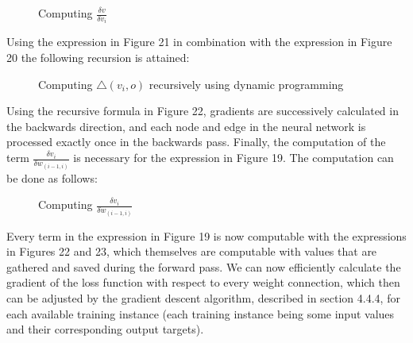 \documentclass[titlepage]{article}
\begin{document}
\vskip 0.2cm

\begin{figure}[h]
    \centerline{}
    \vskip 0.2cm
    \caption{Computing $\frac{\delta v}{\delta v_{i}}$}
\end{figure}

\vskip 0.3cm

\noindent
Using the expression in Figure 21 in combination with the expression in Figure 20 the following recursion is attained:

\vskip 0.3cm

\begin{figure}[h]
    \centerline{
    }
    \vskip 0.3cm
    \caption{Computing $\triangle (v_{i}, o)$ recursively using dynamic programming}
\end{figure}

\vskip 0.2cm

\noindent
Using the recursive formula in Figure 22, gradients are successively calculated in the backwards direction, and each node and edge in the neural network is processed exactly once in the backwards pass. Finally, the computation of the term $\frac{\delta v_{i}}{\delta w_{(i-1, i)}}$ is necessary for the expression in Figure 19. The computation can be done as follows:

\vskip 0.3cm

\begin{figure}[h]
    \centerline{}
    \vskip 0.3cm
    \caption{Computing $\frac{\delta v_{i}}{\delta w_{(i-1, i)}}$}
\end{figure}

\vskip 0.2cm

\noindent
Every term in the expression in Figure 19 is now computable with the expressions in Figures 22 and 23, which themselves are computable with values that are gathered and saved during the forward pass. We can now efficiently calculate the gradient of the loss function with respect to every weight connection, which then can be adjusted by the gradient descent algorithm, described in section 4.4.4, for each available training instance (each training instance being some input values and their corresponding output targets).
\end{document}
